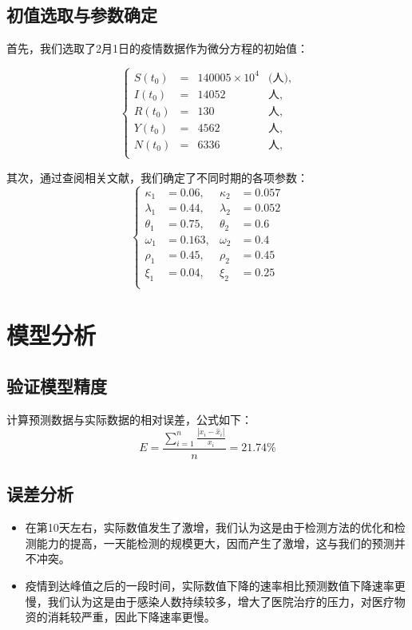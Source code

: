 \documentclass[UTF8]{ctexart}
\begin{document}
	\subsection{初值选取与参数确定}
		首先，我们选取了2月1日的疫情数据作为微分方程的初始值：

		\[\left\{\begin{array}{llcl}
		S(t_0)&=&140005\times10^4&\text{(人)},\\
		I(t_0)&=&14052 &\text{人},\\
		R(t_0)&=&130 &\text{人},\\
		Y(t_0)&=&4562 &\text{人},\\
		N(t_0)&=&6336 &\text{人},\\
		\end{array} \right.\]
		
		其次，通过查阅相关文献，我们确定了不同时期的各项参数：
		\[\left\{\begin{array}{lllll}
		\kappa_{1}&=0.06  ,&\kappa_{2}&=0.057\\
		\lambda_{1}&=0.44 ,&\lambda_{2}&=0.052\\
		\theta_{1}&=0.75  ,&\theta_{2}&=0.6\\
		\omega_{1}&=0.163 ,&\omega_{2}&=0.4\\
		\rho_{1}  &=0.45  ,&\rho_{2}&=0.45\\
		\xi_{1}   &=0.04  ,&\xi_{2}&=0.25\\
		\end{array}\right. \]


\newpage


	\section{模型分析}
		
		\subsection{验证模型精度}
		计算预测数据与实际数据的相对误差，公式如下：
 		\begin{equation}
		E=\frac{\displaystyle \sum_{i=1}^n\frac{|x_i-\hat{x}_i|}{x_i}}{\displaystyle n}=21.74\%
		\end{equation}

		\subsection{误差分析}
			\begin{itemize}
				\item 在第10天左右，实际数值发生了激增，我们认为这是由于检测方法的优化和检测能力的提高，一天能检测的规模更大，因而产生了激增，这与我们的预测并不冲突。\vspace{-1.3ex}
				\item 疫情到达峰值之后的一段时间，实际数值下降的速率相比预测数值下降速率更慢，我们认为这是由于感染人数持续较多，增大了医院治疗的压力，对医疗物资的消耗较严重，因此下降速率更慢。
			\end{itemize}
		
\end{document}
